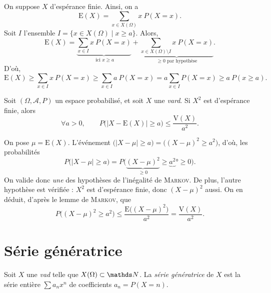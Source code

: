 \begin{prv}
  On suppose $X$\/ d'espérance finie. Ainsi, on a \[
    \mathrm{E}(X) = \sum_{x \in X(\Omega)} x\:P(X = x)
  .\]
  Soit $I$\/ l'ensemble $I = \{x \in X(\Omega) \mid x \ge a\}$.
  Alors, \[
    \mathrm{E}(X) = \underbrace{\sum_{x \in I} x\:P(X = x)}_{\text{ ici } x \ge a} + \underbrace{\sum_{x \in X(\Omega) \setminus I} x\:P(X = x)}_{\ge 0 \text{ par hypothèse}}
  .\]
  D'où, \[
    \mathrm{E}(X) \ge \sum_{x \in I} x\:P(X = x) \ge \sum_{x \in I} a\: P(X = x) = a \sum_{x \in I} P(X = x) \ge a\:P(x \ge a)
  .\]
\end{prv}

\begin{prop}
  Soit $(\Omega, \mathcal{A}, P)$\/ un espace probabilisé, et soit $X$\/ une \textit{vard}. Si $X^2$\/ est d'espérance finie, alors \[
    \forall a > 0, \quad\quad P\Big(\big|X - \mathrm{E}(X)\big| \ge a\Big) \le \frac{\mathrm{V}(X)}{a^2}
  .\]
\end{prop}

\begin{prv}
  On pose $\mu = \mathrm{E}(X)$.
  L'événement $\big(|X - \mu| \ge a\big) = \big((X - \mu)^2 \ge a^2\big)$, d'où, les probabilités \[
    P\big(|X - \mu| \ge a\big) = P\big(\underbrace{(X - \mu)^2}_{\ge 0} \ge \underbrace{a^2}°{\ge 0}\big).
  \] On valide donc \textit{une} des hypothèses de l'inégalité de \textsc{Markov}.
  De plus, l'autre hypothèse est vérifiée : $X^2$\/ est d'espérance finie, donc $(X - \mu)^2$\/ aussi. On en déduit, d'après le lemme de \textsc{Markov}, que \[
    P\big((X-\mu)^2 \ge a^2\big) \le \frac{\mathrm{E}\big((X-\mu)^2\big)}{a^2} = \frac{\mathrm{V}(X)}{a^2}
  .\]
\end{prv}

\section{Série génératrice}

\begin{defn}
  Soit $X$\/ une \textit{vad} telle que $X(\Omega) \subset \N$. La \textit{série génératrice} de $X$\/ est la série entière $\sum a_n x^n$ de coefficients $a_n = P(X = n)$.
\end{defn}



